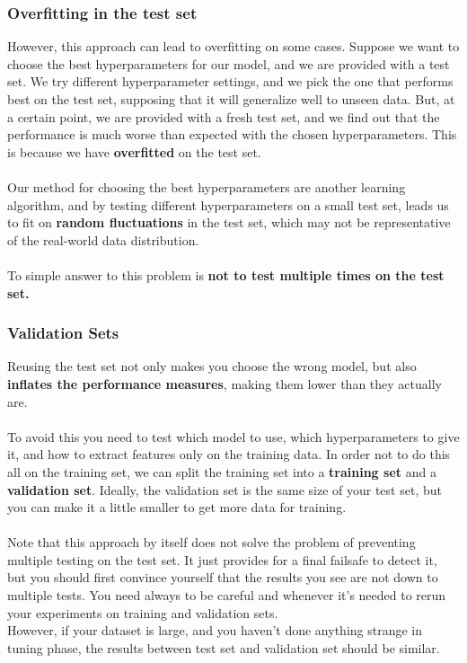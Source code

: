 \subsubsection{Overfitting in the test set}
However, this approach can lead to overfitting on some cases.
Suppose we want to choose the best hyperparameters for our model, and we are provided with a test set.
We try different hyperparameter settings, and we pick the one that performs best on the test set, supposing that it will generalize well to unseen data.
But, at a certain point, we are provided with a fresh test set, and we find out that the performance is much worse than expected with the chosen hyperparameters.
This is because we have \textbf{overfitted} on the test set.
\\\\
Our method for choosing the best hyperparameters are another learning algorithm, and by testing different hyperparameters on a small test set,
leads us to fit on \textbf{random fluctuations} in the test set, which may not be representative of the real-world data distribution.
\\\\
To simple answer to this problem is \textbf{not to test multiple times on the test set.}

\subsubsection{Validation Sets}
Reusing the test set not only makes you choose the wrong model, but also \textbf{inflates the performance measures}, making them lower than they actually are.
\\\\
To avoid this you need to test which model to use, which hyperparameters to give it, and how to extract features only on the training data.
In order not to do this all on the training set, we can split the training set into a \textbf{training set} and a \textbf{validation set}.
Ideally, the validation set is the same size of your test set, but you can make it a little smaller to get more data for training.
\\\\
Note that this approach by itself does not solve the problem of preventing multiple testing on the test set.
It just provides for a final failsafe to detect it, but you should first convince yourself that the results you see are not down to multiple tests.
You need always to be careful and whenever it's needed to rerun your experiments on training and validation sets.
\\
However, if your dataset is large, and you haven't done anything strange in tuning phase, the results between test set and validation set should be similar.

